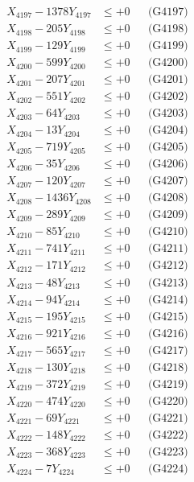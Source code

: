 \documentclass[a4paper,10pt]{article}
\begin{document}
{\begin{align}
X_{4197} - 1378Y_{4197} &\leq +0 && \text{(G4197)} \\
X_{4198} - 205Y_{4198} &\leq +0 && \text{(G4198)} \\
X_{4199} - 129Y_{4199} &\leq +0 && \text{(G4199)} \\
X_{4200} - 599Y_{4200} &\leq +0 && \text{(G4200)} \\
\allowbreak
X_{4201} - 207Y_{4201} &\leq +0 && \text{(G4201)} \\
X_{4202} - 551Y_{4202} &\leq +0 && \text{(G4202)} \\
X_{4203} - 64Y_{4203} &\leq +0 && \text{(G4203)} \\
X_{4204} - 13Y_{4204} &\leq +0 && \text{(G4204)} \\
X_{4205} - 719Y_{4205} &\leq +0 && \text{(G4205)} \\
X_{4206} - 35Y_{4206} &\leq +0 && \text{(G4206)} \\
X_{4207} - 120Y_{4207} &\leq +0 && \text{(G4207)} \\
X_{4208} - 1436Y_{4208} &\leq +0 && \text{(G4208)} \\
X_{4209} - 289Y_{4209} &\leq +0 && \text{(G4209)} \\
X_{4210} - 85Y_{4210} &\leq +0 && \text{(G4210)} \\
\allowbreak
X_{4211} - 741Y_{4211} &\leq +0 && \text{(G4211)} \\
X_{4212} - 171Y_{4212} &\leq +0 && \text{(G4212)} \\
X_{4213} - 48Y_{4213} &\leq +0 && \text{(G4213)} \\
X_{4214} - 94Y_{4214} &\leq +0 && \text{(G4214)} \\
X_{4215} - 195Y_{4215} &\leq +0 && \text{(G4215)} \\
X_{4216} - 921Y_{4216} &\leq +0 && \text{(G4216)} \\
X_{4217} - 565Y_{4217} &\leq +0 && \text{(G4217)} \\
X_{4218} - 130Y_{4218} &\leq +0 && \text{(G4218)} \\
X_{4219} - 372Y_{4219} &\leq +0 && \text{(G4219)} \\
X_{4220} - 474Y_{4220} &\leq +0 && \text{(G4220)} \\
\allowbreak
X_{4221} - 69Y_{4221} &\leq +0 && \text{(G4221)} \\
X_{4222} - 148Y_{4222} &\leq +0 && \text{(G4222)} \\
X_{4223} - 368Y_{4223} &\leq +0 && \text{(G4223)} \\
X_{4224} - 7Y_{4224} &\leq +0 && \text{(G4224)} \\

\end{align}}
\end{document}
